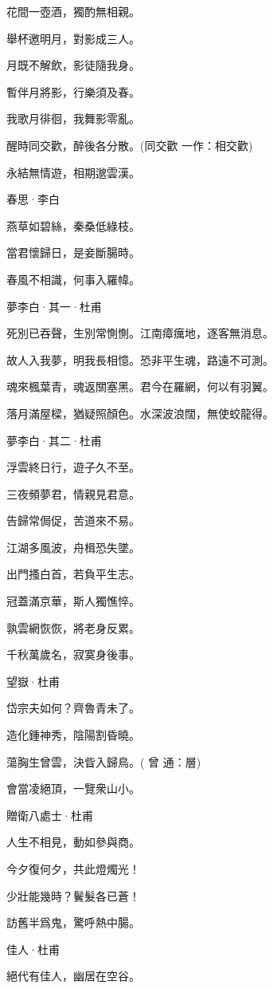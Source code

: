 \documentclass[12pt,a4paper]{ctexbook}
\begin{document}
花間一壺酒，獨酌無相親。\par
舉杯邀明月，對影成三人。\par
月既不解飲，影徒隨我身。\par
暫伴月將影，行樂須及春。\par
我歌月徘徊，我舞影零亂。\par
醒時同交歡，醉後各分散。(同交歡 一作：相交歡)\par
永結無情遊，相期邈雲漢。\par
春思·李白\par
燕草如碧絲，秦桑低綠枝。\par
當君懷歸日，是妾斷腸時。\par
春風不相識，何事入羅幃。\par
夢李白·其一·杜甫\par
死別已吞聲，生別常惻惻。江南瘴癘地，逐客無消息。\par
故人入我夢，明我長相憶。恐非平生魂，路遠不可測。\par
魂來楓葉青，魂返關塞黑。君今在羅網，何以有羽翼。\par
落月滿屋樑，猶疑照顏色。水深波浪闊，無使蛟龍得。\par
夢李白·其二·杜甫\par
浮雲終日行，遊子久不至。\par
三夜頻夢君，情親見君意。\par
告歸常侷促，苦道來不易。\par
江湖多風波，舟楫恐失墜。\par
出門搔白首，若負平生志。\par
冠蓋滿京華，斯人獨憔悴。\par
孰雲網恢恢，將老身反累。\par
千秋萬歲名，寂寞身後事。\par
望嶽·杜甫\par
岱宗夫如何？齊魯青未了。\par
造化鍾神秀，陰陽割昏曉。\par
蕩胸生曾雲，決眥入歸鳥。( 曾 通：層)\par
會當凌絕頂，一覽衆山小。\par
贈衛八處士·杜甫\par
人生不相見，動如參與商。\par
今夕復何夕，共此燈燭光！\par
少壯能幾時？鬢髮各已蒼！\par
訪舊半爲鬼，驚呼熱中腸。\par
佳人·杜甫\par
絕代有佳人，幽居在空谷。\par
\end{document}
